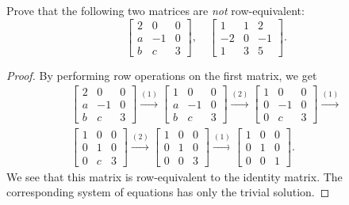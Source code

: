  Prove that the following two matrices are {\em not}
row-equivalent:
\begin{equation*}
  \begin{bmatrix}
    2 & 0 & 0 \\
    a & -1 & 0 \\
    b & c & 3
  \end{bmatrix},
  \quad
  \begin{bmatrix}
    1 & 1 & 2 \\
    -2 & 0 & -1 \\
    1 & 3 & 5
  \end{bmatrix}.
\end{equation*}
\begin{proof}
  By performing row operations on the first matrix, we get
  \begin{gather*}
    \begin{bmatrix}
      2 & 0 & 0 \\
      a & -1 & 0 \\
      b & c & 3
    \end{bmatrix}
    \xrightarrow{(1)}
    \begin{bmatrix}
      1 & 0 & 0 \\
      a & -1 & 0 \\
      b & c & 3
    \end{bmatrix}
    \xrightarrow{(2)}
    \begin{bmatrix}
      1 & 0 & 0 \\
      0 & -1 & 0 \\
      0 & c & 3
    \end{bmatrix}
    \xrightarrow{(1)} \\
    \begin{bmatrix}
      1 & 0 & 0 \\
      0 & 1 & 0 \\
      0 & c & 3
    \end{bmatrix}
    \xrightarrow{(2)}
    \begin{bmatrix}
      1 & 0 & 0 \\
      0 & 1 & 0 \\
      0 & 0 & 3
    \end{bmatrix}
    \xrightarrow{(1)}
    \begin{bmatrix}
      1 & 0 & 0 \\
      0 & 1 & 0 \\
      0 & 0 & 1
    \end{bmatrix}.
  \end{gather*}
  We see that this matrix is row-equivalent to the identity
  matrix. The corresponding system of equations has only the trivial
  solution.


\end{proof}
